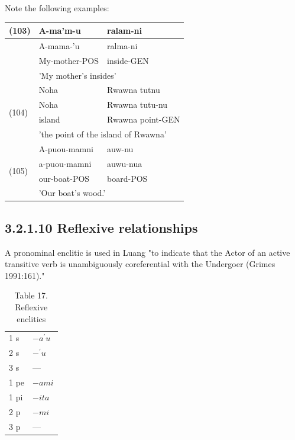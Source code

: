 \documentclass[10pt]{article}
\begin{document}
Note the following examples:

\begin{center}
\begin{tabular}{|l|l|l|}
\hline
\multirow[t]{4}{*}{(103)} & A-ma'm-u & ralam-ni \\
\hline
 & A-mama-'u & ralma-ni \\
\hline
 & My-mother-POS & inside-GEN \\
\hline
 & \multicolumn{2}{|l|}{'My mother's insides'} \\
\hline
\multirow[t]{4}{*}{(104)} & Noha & Rwawna tutnu \\
\hline
 & Noha & Rwawna tutu-nu \\
\hline
 & island & Rwawna point-GEN \\
\hline
 & \multicolumn{2}{|l|}{'the point of the island of Rwawna'} \\
\hline
\multirow[t]{4}{*}{(105)} & A-puou-mamni & auw-nu \\
\hline
 & a-puou-mamni & auwu-nua \\
\hline
 & our-boat-POS & board-POS \\
\hline
 & \multicolumn{2}{|l|}{'Our boat's wood.'} \\
\hline
\end{tabular}
\end{center}

\subsection*{3.2.1.10 Reflexive relationships}
A pronominal enclitic is used in Luang "to indicate that the Actor of an active transitive verb is unambiguously coreferential with the Undergoer (Grimes 1991:161)."

\begin{table}[h]
\begin{center}
\captionsetup{labelformat=empty}
\caption{Table 17. Reflexive enclitics}
\begin{tabular}{|l|l|}
\hline
1 s & \(-a^{\prime} u\) \\
2 s & \(-{ }^{\prime} u\) \\
3 s & --- \\
1 pe & \(-a m i\) \\
1 pi & \(-i t a\) \\
2 p & \(-m i\) \\
3 p & --- \\
\hline
\end{tabular}
\end{center}
\end{table}
\end{document}
